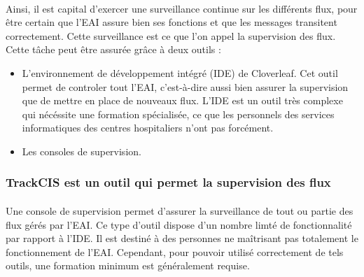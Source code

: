 			\paragraph{}%
			Ainsi, il est capital d'exercer une surveillance continue sur les différents
			flux, pour être certain que l'EAI assure bien ses fonctions et que les
			messages transitent correctement. Cette surveillance est ce que l'on appel la
			supervision des flux. Cette tâche peut être assurée grâce à deux outils :
			\begin{itemize}
			  \item L'environnement de développement intégré (IDE) de Cloverleaf. Cet
			  outil permet de controler tout l'EAI, c'est-à-dire aussi bien assurer la
			  supervision que de mettre en place de nouveaux flux. L'IDE est un outil
			  très complexe qui nécéssite une formation spécialisée, ce que les
			  personnels des services informatiques des centres hospitaliers n'ont pas
			  forcément.
			  \item Les consoles de supervision.
			\end{itemize}
			
		\subsubsection{TrackCIS est un outil qui permet la supervision des flux}
			\paragraph{}%
			Une console de supervision permet d'assurer la surveillance
			de tout ou partie des flux gérés par l'EAI. Ce type d'outil dispose d'un
			nombre limté de fonctionnalité par rapport à l'IDE. Il est destiné à des
			personnes ne maîtrisant pas totalement le fonctionnement de l'EAI. Cependant,
			pour pouvoir utilisé correctement de tels outils, une formation minimum est
			généralement requise.
			
